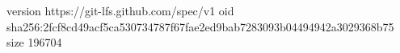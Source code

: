 version https://git-lfs.github.com/spec/v1
oid sha256:2fcf8cd49acf5ca530734787f67fae2ed9bab7283093b04494942a3029368b75
size 196704
